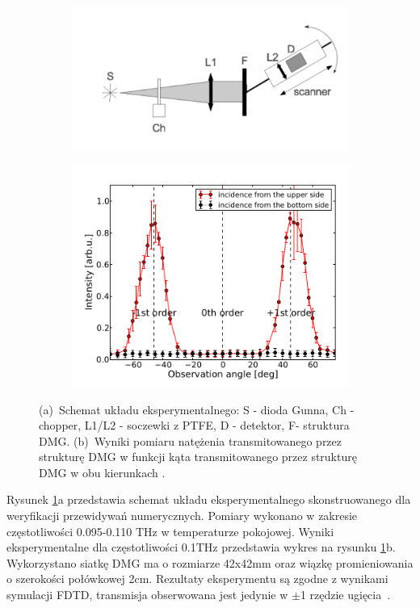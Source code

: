 \begin{figure}
	\begin{subfigure}{0.5\textwidth}
		\includegraphics[width=\textwidth]{images/thz/exp-schem.png}
		\caption{}
	\end{subfigure}
	\begin{subfigure}{0.5\textwidth}
		\centering
		\includegraphics[width=\textwidth]{images/thz/opt-lett-exp.png}
		\caption{}
	\end{subfigure}
	\caption{(a)~Schemat układu eksperymentalnego: S - dioda Gunna, Ch - chopper, L1/L2 - soczewki z PTFE, D - detektor, F- struktura DMG. (b)~Wyniki pomiaru natężenia transmitowanego przez strukturę DMG w funkcji kąta transmitowanego przez strukturę DMG w obu kierunkach \cite{Stolarek:13}.}
	\label{fig:thz-eksp}
\end{figure}

Rysunek \ref{fig:thz-eksp}a przedstawia schemat układu eksperymentalnego skonstruowanego dla weryfikacji przewidywań numerycznych. Pomiary wykonano w zakresie częstotliwości 0.095-0.110 THz w temperaturze pokojowej. Wyniki eksperymentalne dla częstotliwości 0.1THz przedstawia wykres na rysunku \ref{fig:thz-eksp}b. Wykorzystano siatkę DMG ma o rozmiarze 42x42mm oraz wiązkę promieniowania o szerokości połówkowej 2cm. Rezultaty eksperymentu są zgodne z wynikami symulacji FDTD, transmisja obserwowana jest jedynie w $\pm$1 rzędzie ugięcia~\cite{Stolarek:13}. 

